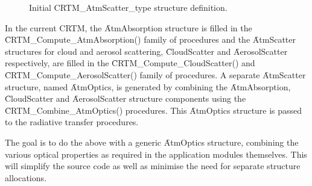 \begin{figure}[htp]
  \centering
  \caption{Initial CRTM\_AtmScatter\_type structure definition.}
  \label{fig:CRTM_AtmScatter_type_structure}
\end{figure}

In the current CRTM, the \f{AtmAbsorption} structure is filled in the \f{CRTM\_Compute\_AtmAbsorption()} family of procedures and the \f{AtmScatter} structures for cloud and aerosol scattering, \f{CloudScatter} and \f{AerosolScatter} respectively, are filled in the \f{CRTM\_Compute\_CloudScatter()} and \f{CRTM\_Compute\_AerosolScatter()} family of procedures. A separate \f{AtmScatter} structure, named \f{AtmOptics}, is generated by combining the \f{AtmAbsorption}, \f{CloudScatter} and \f{AerosolScatter} structure components using the \f{CRTM\_Combine\_AtmOptics()} procedures. This \f{AtmOptics} structure is passed to the radiative transfer procedures.

The goal is to do the above with a generic \f{AtmOptics} structure, combining the various optical properties as required in the application modules themselves. This will simplify the source code as well as minimise the need for separate structure allocations.
